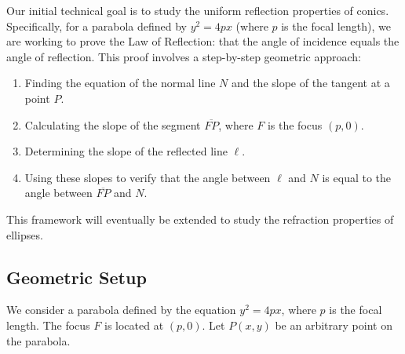 \documentclass{article}
\begin{document}
Our initial technical goal is to study the uniform reflection properties of conics. Specifically, for a parabola defined by $y^2 = 4px$ (where $p$ is the focal length), we are working to prove the Law of Reflection: that the angle of incidence equals the angle of reflection. This proof involves a step-by-step geometric approach:
\begin{enumerate}
    \item Finding the equation of the normal line $N$ and the slope of the tangent at a point $P$.
    \item Calculating the slope of the segment $\overline{FP}$, where $F$ is the focus $(p, 0)$.
    \item Determining the slope of the reflected line $\ell$.
    \item Using these slopes to verify that the angle between $\ell$ and $N$ is equal to the angle between $\overline{FP}$ and $N$.
\end{enumerate}
This framework will eventually be extended to study the refraction properties of ellipses.

\subsection{Geometric Setup}
We consider a parabola defined by the equation $y^2 = 4px$, where $p$ is the focal length. The focus $F$ is located at $(p, 0)$. Let $P(x, y)$ be an arbitrary point on the parabola.
\end{document}
